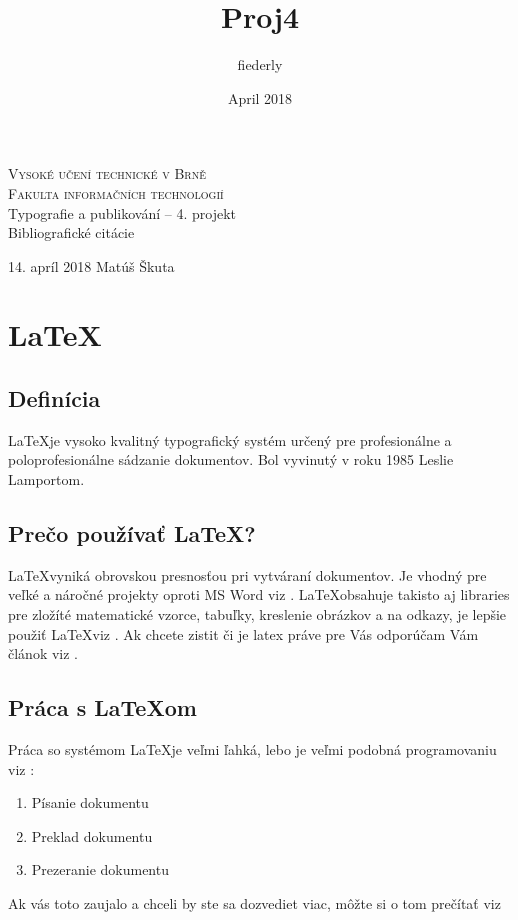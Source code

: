 \documentclass[11pt, a4paper]{article}
\title{Proj4}
\author{fiederly }
\date{April 2018}
\begin{document}
\begin{titlepage}

\thispagestyle{empty}
\begin{center}
\Huge
\textsc{Vysoké učení technické v Brně}\hspace{0.4em}\\
\huge{\textsc{Fakulta informačních technologií}}\hspace{0.4em}\\
\LARGE{ Typografie a publikování – 4. projekt \hspace{0.3em}}\\
\Huge {Bibliografické citácie}\hspace{0.3em}\\
\end{center}
\Large{14. apríl 2018 \hfill
Matúš Škuta}
\end{titlepage}

\section{\LaTeX}

\subsection{Definícia}

\LaTeX je vysoko kvalitný typografický systém určený pre profesionálne a poloprofesionálne sádzanie dokumentov. Bol vyvinutý v roku 1985 Leslie Lamportom.

\subsection{Prečo používať \LaTeX ?}

\LaTeX vyniká obrovskou presnosťou pri vytváraní dokumentov. Je vhodný pre veľké a náročné projekty oproti MS Word viz \cite{WORDvsLATEX}. \LaTeX obsahuje takisto aj libraries pre zložíté matematické vzorce, tabuľky, kreslenie obrázkov a na odkazy, je lepšie použiť \LaTeX viz \cite{Rybicka2003}. Ak chcete zistit či je latex práve pre Vás odporúčam Vám článok viz \cite{IsLatexForMe}. 

\subsection{Práca s \LaTeX om}

Práca so systémom \LaTeX je veľmi ľahká, lebo je veľmi podobná programovaniu viz \cite{Rybicka2003}:
\begin{enumerate}
    \item {Písanie dokumentu}
    \item {Preklad dokumentu}
    \item {Prezeranie dokumentu}
\end{enumerate}
Ak vás toto zaujalo a chceli by ste sa dozvediet viac, môžte si o tom prečítať viz \cite{Rybicka2003}
\end{document}

